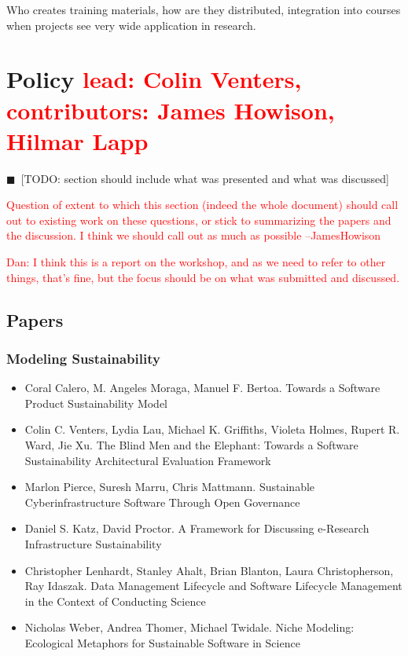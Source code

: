 \documentclass[11pt, oneside]{amsart}
\newcommand{\todo}[1]{{\color{blue}$\blacksquare$~\textsf{[TODO: #1]}}}
\newcommand{\note}[1]{ {\textcolor{red}    { #1 }}}
\begin{document}
Who creates training materials, how are they distributed, integration
into courses when projects see very wide application in research.

\section{Policy \note{lead: Colin Venters, contributors: James Howison, Hilmar Lapp}} \label{sec:policy}

\todo{section should include what was presented and what was discussed}

\note{Question of extent to which this section (indeed the whole document) should call out to existing work on these questions, or stick to summarizing the papers and the discussion. I think we should call out as much as possible --JamesHowison}

\note{Dan: I think this is a report on the workshop, and as we need to refer to other things, that's fine, but the focus should be on what was submitted and discussed.}

\subsection*{Papers}

\subsubsection*{Modeling Sustainability}

\begin{itemize}

\item Coral Calero, M. Angeles Moraga, Manuel F. Bertoa. Towards a
  Software Product Sustainability Model~\cite{Calero_WSSSPE}

\item Colin C. Venters, Lydia Lau, Michael K. Griffiths, Violeta
  Holmes, Rupert R. Ward, Jie Xu. The Blind Men and the Elephant:
  Towards a Software Sustainability Architectural Evaluation Framework~\cite{Venters_WSSSPE}

\item Marlon Pierce, Suresh Marru, Chris Mattmann. Sustainable
  Cyberinfrastructure Software Through Open Governance~\cite{Pierce_WSSSPE}

\item Daniel S. Katz, David Proctor. A Framework for Discussing
  e-Research Infrastructure Sustainability~\cite{Katz_WSSSPE}

\item Christopher Lenhardt, Stanley Ahalt, Brian Blanton, Laura
  Christopherson, Ray Idaszak. Data Management Lifecycle and Software
  Lifecycle Management in the Context of Conducting Science~\cite{Lenhardt_WSSSPE}

\item Nicholas Weber, Andrea Thomer, Michael Twidale. Niche Modeling:
  Ecological Metaphors for Sustainable Software in Science~\cite{Weber_WSSSPE}

\end{itemize}
\end{document}

